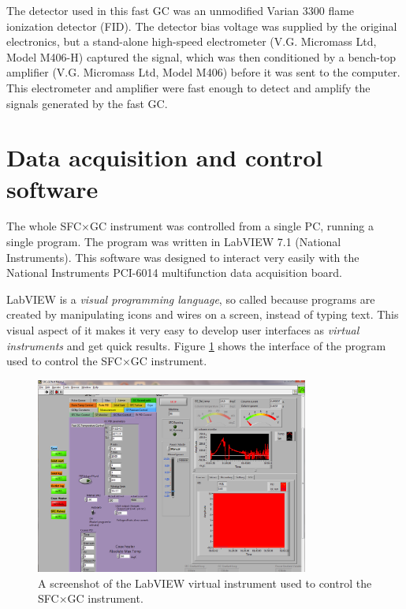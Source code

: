 The detector used in this fast GC was an unmodified Varian\texttrademark{} 3300
flame ionization detector (FID). The detector bias voltage was supplied by the
original electronics, but a stand-alone high-speed electrometer (V.G. Micromass
Ltd, Model M406-H) captured the signal, which was then conditioned by a
bench-top amplifier (V.G. Micromass Ltd, Model M406) before it was sent to the
computer. This electrometer and amplifier were fast enough to detect and amplify
the signals generated by the fast GC.

\section{Data acquisition and control software}

The whole SFC×GC instrument was controlled from a single PC, running a single
program. The program was written in LabVIEW 7.1\texttrademark{} (National
Instruments). This software was designed to interact very easily with the
National Instruments PCI-6014 multifunction data acquisition board.

LabVIEW is a \textit{visual programming language}, so called because programs
are created by manipulating icons and wires on a screen, instead of typing text.
This visual aspect of it makes it very easy to develop user interfaces as
\textit{virtual instruments} and get quick results. Figure \ref{fig:SFCGCFastVI}
shows the interface of the program used to control the SFC×GC instrument.

\begin{figure}
	\centering
	\includegraphics[width=0.8\textwidth]{./Figures/Screenshot.png}
	\decoRule
	
	\caption[The main LabVIEW VI]{A screenshot of the LabVIEW virtual instrument
	used to control the SFC×GC instrument.}
	
	\label{fig:SFCGCFastVI}
\end{figure}


